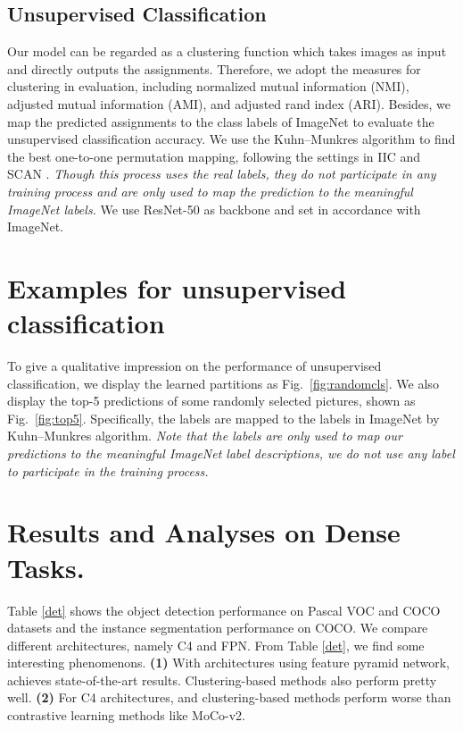 \documentclass[10pt,twocolumn,letterpaper]{article}
\begin{document}
\subsection{Unsupervised Classification} 
Our \ourmethod model can be regarded as a clustering function which takes images as input and directly outputs the assignments. Therefore, we adopt the measures for clustering in evaluation, including normalized mutual information (NMI), adjusted mutual information (AMI), and adjusted rand index (ARI). Besides, we map the predicted assignments to the class labels of ImageNet to evaluate the unsupervised classification accuracy. We use the Kuhn–Munkres algorithm \cite{kuhn1955hungarian} to find the best one-to-one permutation mapping, following the settings in IIC \cite{Ji_2019_ICCV} and SCAN \cite{van2020scan}. \textit{Though this process uses the real labels, they do not participate in any training process and are only used to map the prediction to the meaningful ImageNet labels.} We use ResNet-50 as backbone and set  in accordance with ImageNet.

\section{Examples for unsupervised classification}
To give a qualitative impression on the performance of unsupervised classification, we display the learned partitions as Fig.~\ref{fig:randomcls}. We also display the top-5 predictions of some randomly selected pictures, shown as Fig.~\ref{fig:top5}. Specifically, the labels are mapped to the labels in ImageNet by Kuhn–Munkres algorithm. \textit{Note that the labels are only used to map our predictions to the meaningful ImageNet label descriptions, we do not use any label to participate in the training process.}

\section{Results and Analyses on Dense Tasks.}
Table \ref{det} shows the object detection performance on Pascal VOC and COCO datasets and the instance segmentation performance on COCO. We compare different architectures, namely C4 and FPN. From Table \ref{det}, we find some interesting phenomenons. \textbf{(1)} With architectures using feature pyramid network, \ourmethod achieves state-of-the-art results. Clustering-based methods also perform pretty well. \textbf{(2)} For C4 architectures, \ourmethod and clustering-based methods perform worse than contrastive learning methods like MoCo-v2. 
\end{document}

